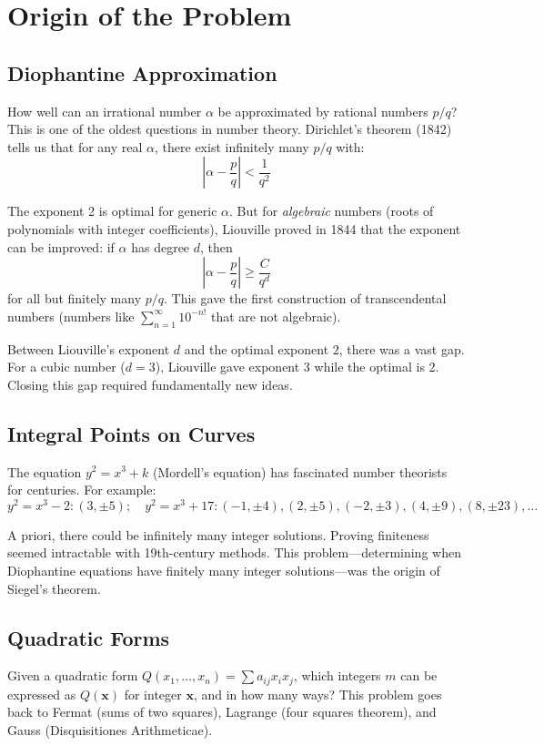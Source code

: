 \section{Origin of the Problem}

\subsection{Diophantine Approximation}

How well can an irrational number $\alpha$ be approximated by rational numbers $p/q$? This is one of the oldest questions in number theory. Dirichlet's theorem (1842) tells us that for any real $\alpha$, there exist infinitely many $p/q$ with:
\[
\left|\alpha - \frac{p}{q}\right| < \frac{1}{q^2}
\]

The exponent 2 is optimal for generic $\alpha$. But for \textit{algebraic} numbers (roots of polynomials with integer coefficients), Liouville proved in 1844 that the exponent can be improved: if $\alpha$ has degree $d$, then
\[
\left|\alpha - \frac{p}{q}\right| \geq \frac{C}{q^d}
\]
for all but finitely many $p/q$. This gave the first construction of transcendental numbers (numbers like $\sum_{n=1}^\infty 10^{-n!}$ that are not algebraic).

Between Liouville's exponent $d$ and the optimal exponent $2$, there was a vast gap. For a cubic number ($d=3$), Liouville gave exponent 3 while the optimal is 2. Closing this gap required fundamentally new ideas.

\subsection{Integral Points on Curves}

The equation $y^2 = x^3 + k$ (Mordell's equation) has fascinated number theorists for centuries. For example:
\[
y^2 = x^3 - 2: (3, \pm 5); \quad y^2 = x^3 + 17: (-1,\pm 4), (2,\pm 5), (-2,\pm 3), (4,\pm 9), (8,\pm 23), \dots
\]

A priori, there could be infinitely many integer solutions. Proving finiteness seemed intractable with 19th-century methods. This problem---determining when Diophantine equations have finitely many integer solutions---was the origin of Siegel's theorem.

\subsection{Quadratic Forms}

Given a quadratic form $Q(x_1,\dots,x_n) = \sum a_{ij}x_ix_j$, which integers $m$ can be expressed as $Q(\mathbf{x})$ for integer $\mathbf{x}$, and in how many ways? This problem goes back to Fermat (sums of two squares), Lagrange (four squares theorem), and Gauss (Disquisitiones Arithmeticae).

